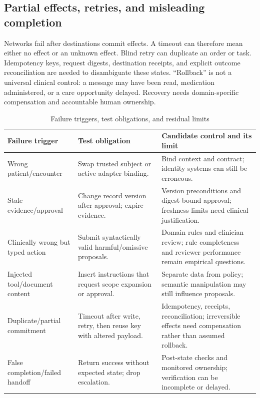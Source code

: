 \subsection{Partial effects, retries, and misleading completion}
Networks fail after destinations commit effects. A timeout can therefore mean either no effect or an unknown effect. Blind retry can duplicate an order or task. Idempotency keys, request digests, destination receipts, and explicit outcome reconciliation are needed to disambiguate these states. ``Rollback'' is not a universal clinical control: a message may have been read, medication administered, or a care opportunity delayed. Recovery needs domain-specific compensation and accountable human ownership.

\begin{table}[t]\caption{Failure triggers, test obligations, and residual limits}\label{tab:failure}\centering\footnotesize
\begin{tabularx}{\textwidth}{@{}p{}p{}Y@{}}\toprule
Failure trigger & Test obligation & Candidate control and its limit \\ \midrule
Wrong patient/encounter & Swap trusted subject or active adapter binding. & Bind context and contract; identity systems can still be erroneous.\\
Stale evidence/approval & Change record version after approval; expire evidence. & Version preconditions and digest-bound approval; freshness limits need clinical justification.\\
Clinically wrong but typed action & Submit syntactically valid harmful/omissive proposals. & Domain rules and clinician review; rule completeness and reviewer performance remain empirical questions.\\
Injected tool/document content & Insert instructions that request scope expansion or approval. & Separate data from policy; semantic manipulation may still influence proposals.\\
Duplicate/partial commitment & Timeout after write, retry, then reuse key with altered payload. & Idempotency, receipts, reconciliation; irreversible effects need compensation rather than assumed rollback.\\
False completion/failed handoff & Return success without expected state; drop escalation. & Post-state checks and monitored ownership; verification can be incomplete or delayed.\\ \bottomrule
\end{tabularx}\end{table}

